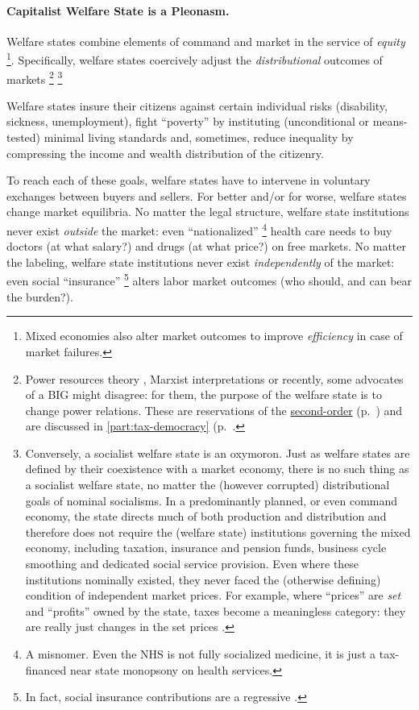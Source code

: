 \paragraph{Capitalist Welfare State is a Pleonasm.}  \label{sec:interface} 
Welfare states combine elements of command and market in the service of \emph{equity}
\footnote{
	Mixed economies also alter market outcomes to improve \emph{efficiency} in case of market failures.
}. 
Specifically, welfare states coercively adjust the \emph{distributional} outcomes of markets 
\footnote{
	Power resources theory \citep[for example][]{Korpi2003}, Marxist interpretations \citep[for example][]{Offe1972} or recently, some advocates of a \gls{BIG} might disagree: for them, the purpose of the welfare state is to change power relations. 
	These are reservations of the \hyperref[sec:epistemology]{second-order} (p.~\pageref{sec:epistemology}) and are discussed in \autoref{part:tax-democracy} (p.~\pageref{part:tax-democracy}.%
	}
\footnote{
	Conversely, a socialist welfare state is an oxymoron. 
	Just as welfare states are defined by their coexistence with a market economy, there is no such thing as a socialist welfare state, no matter the (however corrupted) distributional goals of nominal socialisms. 
	In a predominantly planned, or even command economy, the state directs much of both production and distribution and therefore does not require the (welfare state) institutions governing the mixed economy, including taxation, insurance and pension funds, business cycle smoothing and dedicated social service provision. 
	Even where these institutions nominally existed, they never faced the (otherwise defining) condition of independent market prices. For example, where ``prices'' are \emph{set} and ``profits'' owned by the state, taxes become a meaningless category: they are really just changes in the set prices \citep[for example,][23]{Bonker2006}.
}

Welfare states insure their citizens against certain individual risks (disability, sickness, unemployment), fight ``poverty'' by instituting (unconditional or means-tested) minimal living standards and, sometimes, reduce inequality by compressing the income and wealth distribution of the citizenry.

To reach each of these goals, welfare states have to intervene in voluntary exchanges between buyers and sellers. 
For better and/or for worse, welfare states change market equilibria. 
No matter the legal structure, welfare state institutions never exist \emph{outside} the market: even ``nationalized''
\footnote{
	A misnomer. 
	Even the \gls{NHS} is not fully socialized medicine, it is just a tax-financed near state monopsony on health services.
} 
health care needs to buy doctors (at what salary?) and drugs (at what price?) on free markets. 
No matter the labeling, welfare state institutions never exist \emph{independently} of the market: even social ``insurance''
\footnote{
	In fact, social insurance contributions are a regressive . %
} 
alters labor market outcomes (who should, and can bear the burden?). 

